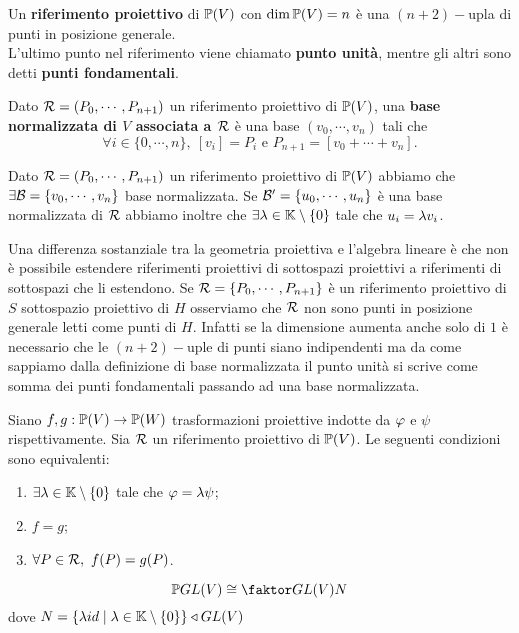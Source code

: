 \begin{multicols*}{2}
    \begin{definition}
        Un \textbf{riferimento proiettivo} di ${\mathbb{P}(V)}$ con $\dim {\mathbb{P}(V)}=n$ \`e una $(n+2)-$upla di punti in posizione generale.\\
        L'ultimo punto nel riferimento viene chiamato \textbf{punto unit\`a}, mentre gli altri sono detti \textbf{punti fondamentali}.
    \end{definition}
    \begin{definition}
    Dato $\mathcal{R}=(P_0,\cdots,P_{n+1})$ un riferimento proiettivo di ${\mathbb{P}(V)}$, una \textbf{base normalizzata di $V$ associata a $\mathcal{R}$} \`e una base $(v_0,\cdots,v_n)$ tali che \[\forall i\in\{0,\cdots,n\},\ [v_i]=P_i\text{ e }P_{n+1}=[v_0+\cdots+v_n].\]
    \end{definition}

    \begin{theorem}
    Dato $\mathcal{R}=(P_0,\cdots,P_{n+1})$ un riferimento proiettivo di ${\mathbb{P}(V)}$ abbiamo che $\exists \mathcal{B}=\{v_0,\cdots,v_n\}$ base normalizzata. Se $\mathcal{B}'=\{u_0,\cdots,u_n\}$ \`e una base normalizzata di $\mathcal{R}$ abbiamo inoltre che $\exists \lambda\in\mathbb{K}\setminus\{0\}$ tale che $u_i=\lambda v_i$.
    \end{theorem}

    \begin{remark}
    Una differenza sostanziale tra la geometria proiettiva e l'algebra lineare \`e che non \`e possibile estendere riferimenti proiettivi di sottospazi proiettivi a riferimenti di sottospazi che li estendono. Se $\mathcal{R}=\{P_0,\cdots,P_{n+1}\}$ \`e un riferimento proiettivo di $S$ sottospazio proiettivo di $H$ osserviamo che $\mathcal{R}$ non sono punti in posizione generale letti come punti di $H$. Infatti se la dimensione aumenta anche solo di $1$ \`e necessario che le $(n+2)-$uple di punti siano indipendenti ma da come sappiamo dalla definizione di base normalizzata il punto unit\`a si scrive come somma dei punti fondamentali passando ad una base normalizzata.
    \end{remark}


    \begin{theorem}\label{TrasformazioniProiettiveSonoUnivocamenteDeterminateDalValoreSuUnRiferimento}
    Siano $f,g:{\mathbb{P}(V)}\to{\mathbb{P}(W)}$ trasformazioni proiettive indotte da $\varphi$ e $\psi$ rispettivamente. Sia $\mathcal{R}$ un riferimento proiettivo di ${\mathbb{P}(V)}$. Le seguenti condizioni sono equivalenti:
    \begin{enumerate}
    \item $\exists \lambda\in\mathbb{K}\setminus\{0\}$ tale che $\varphi=\lambda\psi$;
    \item $f=g$;
    \item $\forall P\in \Rc,\ f(P)=g(P)$.
    \end{enumerate}
    \end{theorem}
    \begin{corollary}
        \[\PGL V\cong\quot{\GL V}{N}\] dove $N=\{\la id\mid \la\in \K\nz\}\triangleleft \GL V$
    \end{corollary}


\end{multicols*}
